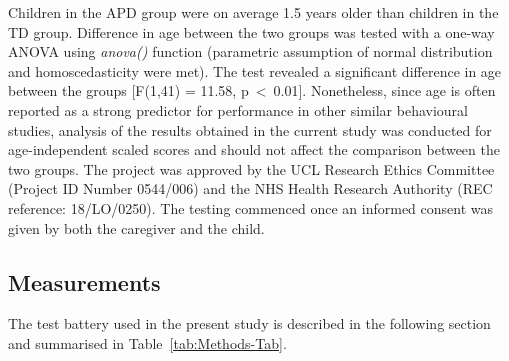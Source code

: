 \documentclass[a4paper, twoside]{templates/ociamthesis}
\begin{document}
Children in the APD group were on average 1.5 years older than children in the TD group. Difference in age between the two groups was tested with a
one-way ANOVA using \emph{anova()} function (parametric assumption of normal distribution and homoscedasticity were met). The test revealed a significant
difference in age between the groups {[}F(1,41) = 11.58, p~\textless~0.01{]}. Nonetheless, since age is often reported as a strong predictor for performance in other similar behavioural studies, analysis of the results obtained in the current study was conducted for age-independent scaled scores and should not affect the comparison between the two groups. The project was approved by the UCL Research Ethics Committee (Project ID Number 0544/006) and the NHS Health Research Authority (REC reference: 18/LO/0250). The testing commenced once an informed consent was given by both the caregiver and the child.

\hypertarget{measurements}{%
\subsection{Measurements}\label{measurements}}

The test battery used in the present study is described in the following section and summarised in Table~\ref{tab:Methods-Tab}.
\end{document}

